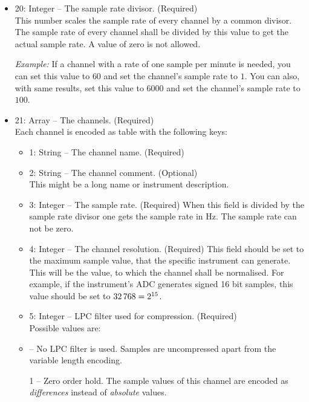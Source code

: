 \documentclass[DIV=10]{scrartcl}
\renewenvironment{quote}
{\list{}{
  \setlength{\rightmargin}{0cm}
  \setlength{\leftmargin}{0.75cm}}%
\item\relax\ignorespaces}
{\unskip\unskip\endlist}
\begin{document}
\begin{itemize}
  \item 20: Integer – The sample rate divisor. (Required)\\
  This number scales the sample rate of every channel by a common divisor.
  The sample rate of every channel shall be divided by this value to get the actual sample rate.
  A value of zero is not allowed.

  \emph{Example:} If a channel with a rate of one sample per minute is needed, you can set this value to \(60\) and set the channel’s sample rate to \(1\).
  You can also, with same results, set this value to \(6000\) and set the channel’s sample rate to \(100\).
  \item 21: Array – The channels. (Required)\\
  Each channel is encoded as table with the following keys:
  \begin{itemize}
    \item 1: String – The channel name. (Required)
    \item 2: String – The channel comment. (Optional)\\
    This might be a long name or instrument description.
    \item 3: Integer – The sample rate. (Required)
    When this field is divided by the sample rate divisor one gets the sample rate in Hz.
    The sample rate can not be zero.
    \item 4: Integer – The channel resolution. (Required)
    This field should be set to the maximum sample value, that the specific instrument can generate.
    This will be the value, to which the channel shall be normalised.
    For example, if the instrument’s ADC generates signed 16 bit samples, this value should be set to \(32\text{\,}768 = 2^{15}\).
    \item 5: Integer – LPC filter used for compression. (Required)\\
    Possible values are:
    \begin{quote}
      0 – No LPC filter is used.
      Samples are uncompressed apart from the variable length encoding.

      1 – Zero order hold.
      The sample values of this channel are encoded as \emph{differences} instead of \emph{absolute} values.


\end{quote}
\end{itemize}
\end{itemize}
\end{document}
